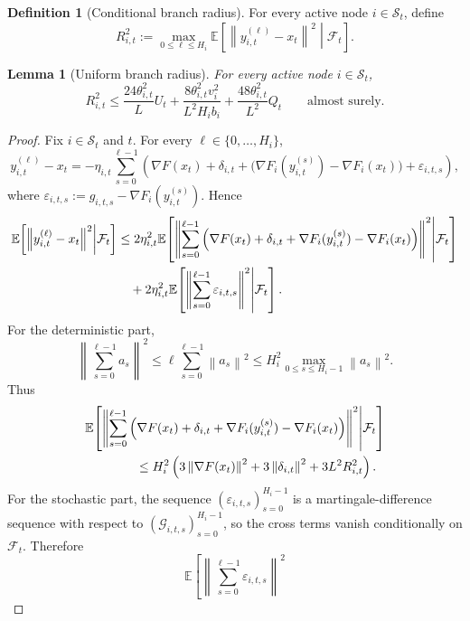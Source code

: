 \documentclass{article}
\newtheorem{lemma}[theorem]{Lemma}
\theoremstyle{definition}
\newtheorem{definition}[theorem]{Definition}
\newcommand{\EE}{\mathbb E}
\newcommand{\cF}{\mathcal F}
\newcommand{\cG}{\mathcal G}
\newcommand{\norm}[1]{\left\lVert #1\right\rVert}
\begin{document}
\begin{definition}[Conditional branch radius]
\label{def:radius}
For every active node $i\in\mathcal S_t$, define
\[
R_{i,t}^2
:=
\max_{0\le \ell\le H_i}
\EE\!\left[\norm{y_{i,t}^{(\ell)}-x_t}^2\middle|\cF_t\right].
\]
\end{definition}

\begin{lemma}[Uniform branch radius]
\label{lem:radius}
For every active node $i\in\mathcal S_t$,
\[
R_{i,t}^2
\le
\frac{24\theta_{i,t}^2}{L}U_t
+
\frac{8\theta_{i,t}^2 v_i^2}{L^2 H_i b_i}
+
\frac{48\theta_{i,t}^2}{L^2}Q_t
\qquad\text{almost surely.}
\]
\end{lemma}

\begin{proof}
Fix $i\in\mathcal S_t$ and $t$. For every $\ell\in\{0,\dots,H_i\}$,
\[
y_{i,t}^{(\ell)}-x_t
=
-\eta_{i,t}\sum_{s=0}^{\ell-1}
\left(
\nabla F(x_t)+\delta_{i,t}
+\bigl(\nabla F_i(y_{i,t}^{(s)})-\nabla F_i(x_t)\bigr)
+\varepsilon_{i,t,s}
\right),
\]
where $\varepsilon_{i,t,s}:=g_{i,t,s}-\nabla F_i(y_{i,t}^{(s)})$.
Hence
\begin{align}
\EE\!\left[\norm{y_{i,t}^{(\ell)}-x_t}^2\middle|\cF_t\right]
&\le
2\eta_{i,t}^2
\EE\!\left[
\left\|
\sum_{s=0}^{\ell-1}
\left(
\nabla F(x_t)+\delta_{i,t}
+\nabla F_i(y_{i,t}^{(s)})-\nabla F_i(x_t)
\right)
\right\|^2
\middle|\cF_t
\right]
\notag\\
&\quad+
2\eta_{i,t}^2
\EE\!\left[
\left\|\sum_{s=0}^{\ell-1}\varepsilon_{i,t,s}\right\|^2
\middle|\cF_t
\right].
\label{eq:radius-split-app}
\end{align}
For the deterministic part,
\[
\left\|\sum_{s=0}^{\ell-1}a_s\right\|^2
\le
\ell\sum_{s=0}^{\ell-1}\norm{a_s}^2
\le
H_i^2\max_{0\le s\le H_i-1}\norm{a_s}^2.
\]
Thus
\begin{align}
&\EE\!\left[
\left\|
\sum_{s=0}^{\ell-1}
\left(
\nabla F(x_t)+\delta_{i,t}
+\nabla F_i(y_{i,t}^{(s)})-\nabla F_i(x_t)
\right)
\right\|^2
\middle|\cF_t
\right]
\notag\\
&\qquad\qquad\le
H_i^2\left(
3\norm{\nabla F(x_t)}^2
+
3\norm{\delta_{i,t}}^2
+
3L^2R_{i,t}^2
\right).
\label{eq:radius-det-app}
\end{align}
For the stochastic part, the sequence $(\varepsilon_{i,t,s})_{s=0}^{H_i-1}$ is a
martingale-difference sequence with respect to $(\cG_{i,t,s})_{s=0}^{H_i-1}$,
so the cross terms vanish conditionally on $\cF_t$. Therefore
\begin{equation}
\EE\!\left[
\left\|\sum_{s=0}^{\ell-1}\varepsilon_{i,t,s}\right\|^2

\end{equation}
\end{proof}
\end{document}
